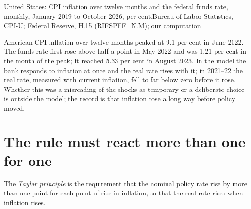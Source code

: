 \begin{omchart}{United States: CPI inflation over twelve months and the federal funds rate, monthly, January 2019 to
  October 2026, per cent.}{Bureau of Labor Statistics, CPI-U; Federal Reserve, H.15 (RIFSPFF\_N.M); our computation}
\end{omchart}

\begin{record}[2021--23]
American CPI inflation over twelve months peaked at 9.1 per cent in June 2022. The funds rate first rose above half a point in
May 2022 and was 1.21 per cent in the month of the peak; it reached 5.33 per cent in August 2023. In the model the bank responds
to inflation at once and the real rate rises with it; in 2021--22 the real rate, measured with current inflation, fell to
far below zero before it rose. Whether this was a misreading of the shocks as temporary or a deliberate choice is
outside the model; the record is that inflation rose a long way before policy moved.
\end{record}

\section{The rule must react more than one for one}\label{sec:b2:three-equation-model:taylor-principle}

\begin{definition}\label{def:b2:three-equation-model:taylor-principle}
The \emph{Taylor principle} is the requirement that the nominal policy rate rise by more than one
point for each point of rise in inflation, so that the real rate rises when inflation rises.
\end{definition}

